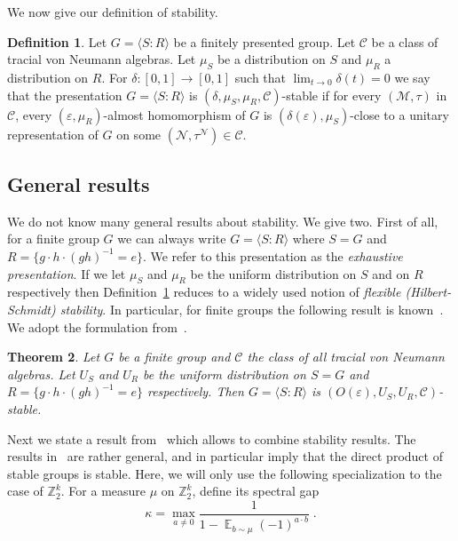 \documentclass[11pt]{article}
\newtheorem{theorem}{Theorem}[section]
\theoremstyle{definition}
\newtheorem{definition}[theorem]{Definition}
\DeclareMathOperator*{\Expectation}{\mathbb{E}}
\newcommand{\Es}[1]{\Expectation_{#1}}
\newcommand{\Z}{\ensuremath{\mathbb{Z}}}
\newcommand{\mC}{\ensuremath{\mathcal{C}}}
\newcommand{\cM}{\ensuremath{\mathcal{M}}}
\newcommand{\eps}{\varepsilon}
\newcommand{\mN}{\mathcal{N}}
\begin{document}
We now give our definition of stability.

\begin{definition}\label{def:eff-stab}
Let $G = \langle S:R\rangle $ be a finitely presented group. Let $\mC$ be a class of tracial von Neumann algebras. Let $\mu_S$ be a distribution on $S$ and $\mu_R$ a distribution on $R$. For $\delta:[0,1]\to[0,1]$ such that $\lim_{t\to 0}\delta(t)=0$ we say that  the presentation $G=\langle S:R\rangle$ is $(\delta,\mu_S,\mu_R,\mC)$-stable if for every $(\cM,\tau)$ in $\mC$, every $(\eps,\mu_R)$-almost homomorphism of $G$ is $(\delta(\eps),\mu_S)$-close to a unitary representation of $G$ on some $(\mN,\tau^\mN)\in \mC$. 
\end{definition}



\subsection{General results}

We do not know many general results about stability. We give two. First of all, 
for a finite group $G$ we can always write $G=\langle S:R\rangle$ where $S = G$ and $R=\{ g\cdot h \cdot (gh)^{-1} =e \}$. We refer to this presentation as the \emph{exhaustive presentation}. If we let $\mu_S$ and $\mu_R$ be the uniform distribution on $S$ and on $R$ respectively then Definition~\ref{def:eff-stab} reduces to a widely used notion of \emph{flexible (Hilbert-Schmidt) stability}. In particular, for finite groups the following result is known~\cite{gowers2017inverse,de2019operator}. We adopt the formulation from~\cite[Theorem 1.4]{de2022spectral}.

\begin{theorem}\label{thm:gh}
Let $G$ be a finite group and $\mC$ the class of all tracial von Neumann algebras. Let $U_S$ and $U_R$ be the uniform distribution on $S=G$ and $R=\{ g\cdot h \cdot (gh)^{-1}=e \}$ respectively. Then $G=\langle S:R\rangle$ is $(O(\eps),U_S,U_R,\mC)$-stable.  
\end{theorem}

Next we state a result from~\cite{de2022spectral} which allows to combine stability results. The results in~\cite{de2022spectral} are rather general, and in particular imply that the direct product of stable groups is stable. Here, we will only use the following specialization to the case of $\Z_2^k$. For a measure $\mu$ on $\Z_2^k$, define its spectral gap 
\[ \kappa = \max_{a\neq 0} \frac{1}{1-\Es{b\sim\mu}(-1)^{a\cdot b}}\;.\] 
\end{document}
